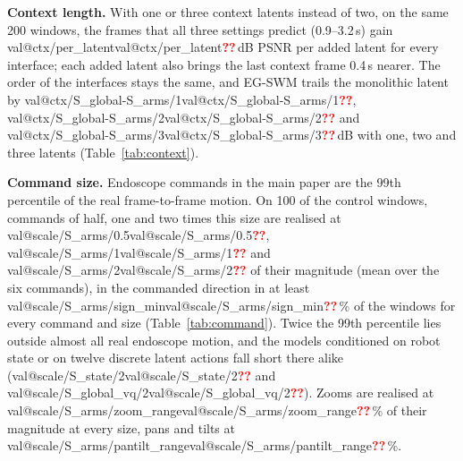 \documentclass[journal]{IEEEtran}
\makeatletter
\newcommand{\method}{EG-SWM}
\newcommand{\val}[1]{\ifcsname val@#1\endcsname\csname val@#1\endcsname\else\textcolor{red}{\textbf{??}}\fi}
\makeatother
\begin{document}

\textbf{Context length.} With one or three context latents instead of two, on the same 200 windows, the frames that all three settings predict (0.9--3.2\,s) gain \val{ctx/per_latent}\,dB PSNR per added latent for every interface; each added latent also brings the last context frame 0.4\,s nearer. The order of the interfaces stays the same, and \method{} trails the monolithic latent by \val{ctx/S_global-S_arms/1}, \val{ctx/S_global-S_arms/2} and \val{ctx/S_global-S_arms/3}\,dB with one, two and three latents (Table~\ref{tab:context}).


\textbf{Command size.} Endoscope commands in the main paper are the 99th percentile of the real frame-to-frame motion. On 100 of the control windows, commands of half, one and two times this size are realised at \val{scale/S_arms/0.5}, \val{scale/S_arms/1} and \val{scale/S_arms/2} of their magnitude (mean over the six commands), in the commanded direction in at least \val{scale/S_arms/sign_min}\,\% of the windows for every command and size (Table~\ref{tab:command}). Twice the 99th percentile lies outside almost all real endoscope motion, and the models conditioned on robot state or on twelve discrete latent actions fall short there alike (\val{scale/S_state/2} and \val{scale/S_global_vq/2}). Zooms are realised at \val{scale/S_arms/zoom_range}\,\% of their magnitude at every size, pans and tilts at \val{scale/S_arms/pantilt_range}\,\%.

\end{document}
